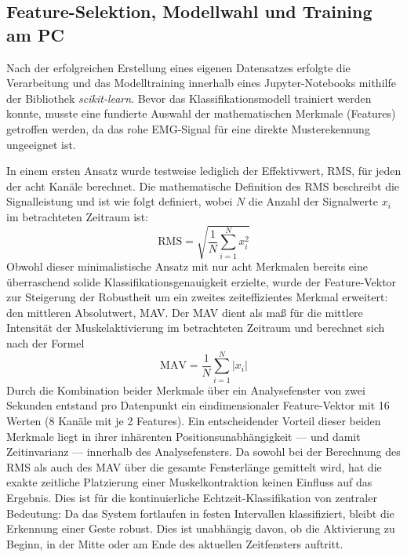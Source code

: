     \subsection{Feature-Selektion, Modellwahl und Training am PC}
    \label{subsec:features_training}
    Nach der erfolgreichen Erstellung eines eigenen Datensatzes erfolgte die Verarbeitung und das Modelltraining innerhalb eines Jupyter-Notebooks mithilfe der Bibliothek \textit{scikit-learn}. Bevor das Klassifikationsmodell trainiert werden konnte, musste eine fundierte Auswahl der mathematischen Merkmale (Features) getroffen werden, da das rohe \ac{EMG}-Signal für eine direkte Musterekennung ungeeignet ist.

    In einem ersten Ansatz wurde testweise lediglich der Effektivwert, \ac{RMS}, für jeden der acht Kanäle berechnet. Die mathematische Definition des \ac{RMS} beschreibt die Signalleistung und ist wie folgt definiert, wobei $N$ die Anzahl der Signalwerte $x_i$ im betrachteten Zeitraum ist:
    \begin{equation*}
        \text{RMS} = \sqrt{\frac{1}{N} \sum_{i=1}^{N} x_i^2}
    \end{equation*}
    Obwohl dieser minimalistische Ansatz mit nur acht Merkmalen bereits eine überraschend solide Klassifikationsgenauigkeit erzielte, wurde der Feature-Vektor zur Steigerung der Robustheit um ein zweites zeiteffizientes Merkmal erweitert: den mittleren Absolutwert, \ac{MAV}. Der \ac{MAV} dient als maß für die mittlere Intensität der Muskelaktivierung im betrachteten Zeitraum und berechnet sich nach der Formel
    \begin{equation*}
        \text{MAV} = \frac{1}{N} \sum_{i=1}^{N} |x_i|
    \end{equation*}
    Durch die Kombination beider Merkmale über ein Analysefenster von zwei Sekunden entstand pro Datenpunkt ein eindimensionaler Feature-Vektor mit 16 Werten (8 Kanäle mit je 2 Features). Ein entscheidender Vorteil dieser beiden Merkmale liegt in ihrer inhärenten Positionsunabhängigkeit --- und damit Zeitinvarianz --- innerhalb des Analysefensters. Da sowohl bei der Berechnung des \ac{RMS} als auch des \ac{MAV} über die gesamte Fensterlänge gemittelt wird, hat die exakte zeitliche Platzierung einer Muskelkontraktion keinen Einfluss auf das Ergebnis. Dies ist für die kontinuierliche Echtzeit-Klassifikation von zentraler Bedeutung: Da das System fortlaufen in festen Intervallen klassifiziert, bleibt die Erkennung einer Geste robust. Dies ist unabhängig davon, ob die Aktivierung zu Beginn, in der Mitte oder am Ende des aktuellen Zeitfensters auftritt.
    

